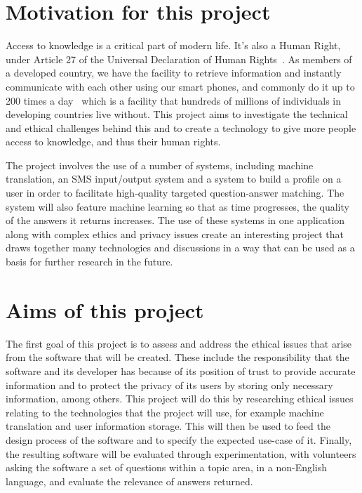 \documentclass[authoryearcitations]{UoYCSproject}
\begin{document}
\section{Motivation for this project}
Access to knowledge is a critical part of modern life.  It's also a Human Right, under Article 27 of the Universal Declaration of Human Rights~\cite{community1948universal}.  As members of a developed country, we have the facility to retrieve information and instantly communicate with each other using our smart phones, and commonly do it up to 200 times a day~\cite{falaki} which is a facility that hundreds of millions of individuals in developing countries live without.  This project aims to investigate the technical and ethical challenges behind this and to create a technology to give more people access to knowledge, and thus their human rights.

The project involves the use of a number of systems, including machine translation, an SMS input/output system and a system to build a profile on a user in order to facilitate high-quality targeted question-answer matching.  The system will also feature machine learning so that as time progresses, the quality of the answers it returns increases.  The use of these systems in one application along with complex ethics and privacy issues create an interesting project that draws together many technologies and discussions in a way that can be used as a basis for further research in the future.

\section{Aims of this project}

The first goal of this project is to assess and address the ethical issues that arise from the software that will be created.  These include the responsibility that the software and its developer has because of its position of trust to provide accurate information and to protect the privacy of its users by storing only necessary information, among others.  This project will do this by researching ethical issues relating to the technologies that the project will use, for example machine translation and user information storage.  This will then be used to feed the design process of the software and to specify the expected use-case of it.  Finally, the resulting software will be evaluated through experimentation, with volunteers asking the software a set of questions within a topic area, in a non-English language, and evaluate the relevance of answers returned.
\end{document}
